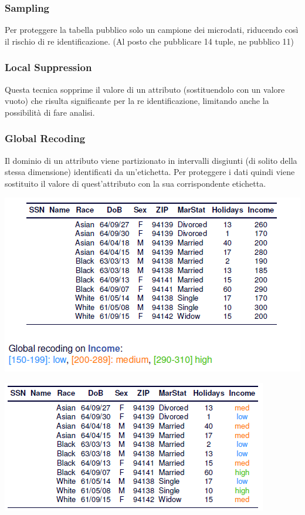 \subsubsection{Sampling}
Per proteggere la tabella pubblico solo un campione dei microdati, riducendo così il rischio di re identificazione. (Al posto che pubblicare 14 tuple, ne pubblico 11)

\subsubsection{Local Suppression}
Questa tecnica sopprime il valore di un attributo (sostituendolo con un valore vuoto) che risulta significante per la re identificazione, limitando anche la possibilità di fare analisi.

\subsubsection{Global Recoding}
Il dominio di un attributo viene partizionato in intervalli disgiunti (di solito della stessa dimensione) identificati da un'etichetta. Per proteggere i dati quindi viene sostituito il valore di quest'attributo con la sua corrispondente etichetta.
\begin{center}
    \includegraphics[scale=0.5]{img/globrec1.png}
\end{center}
\begin{center}
    \includegraphics[scale=0.5]{img/globrec2.png}
\end{center}

